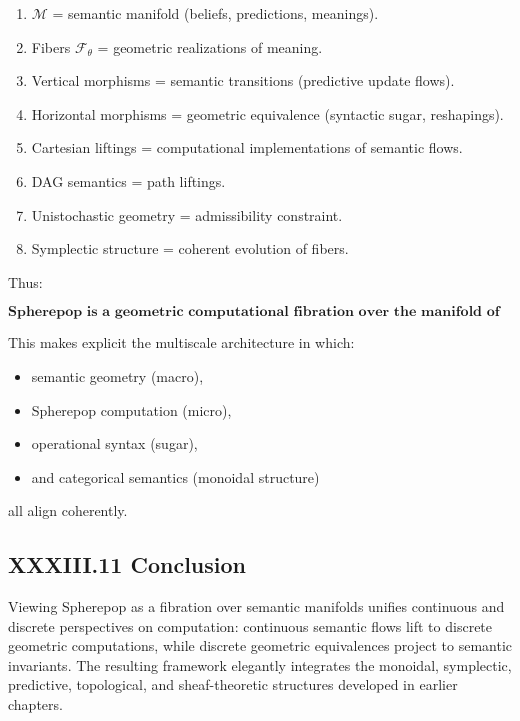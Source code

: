 \documentclass[11pt,letterpaper]{article}
\begin{document}
\begin{enumerate}
    \item $\mathcal{M}$ = semantic manifold (beliefs, predictions, meanings).
    \item Fibers $\mathcal{F}_\theta$ = geometric realizations of meaning.
    \item Vertical morphisms = semantic transitions (predictive update flows).
    \item Horizontal morphisms = geometric equivalence (syntactic sugar, reshapings).
    \item Cartesian liftings = computational implementations of semantic flows.
    \item DAG semantics = path liftings.
    \item Unistochastic geometry = admissibility constraint.
    \item Symplectic structure = coherent evolution of fibers.
\end{enumerate}

Thus:

\[
\boxed{
\textbf{Spherepop is a geometric computational fibration over the manifold of meaning.}
}
\]

This makes explicit the multiscale architecture in which:

\begin{itemize}
    \item semantic geometry (macro),
    \item Spherepop computation (micro),
    \item operational syntax (sugar),
    \item and categorical semantics (monoidal structure)
\end{itemize}

all align coherently.

\subsection{XXXIII.11 Conclusion}

Viewing Spherepop as a fibration over semantic manifolds unifies continuous and discrete perspectives on computation: continuous semantic flows lift to discrete geometric computations, while discrete geometric equivalences project to semantic invariants. The resulting framework elegantly integrates the monoidal, symplectic, predictive, topological, and sheaf-theoretic structures developed in earlier chapters.
\end{document}
